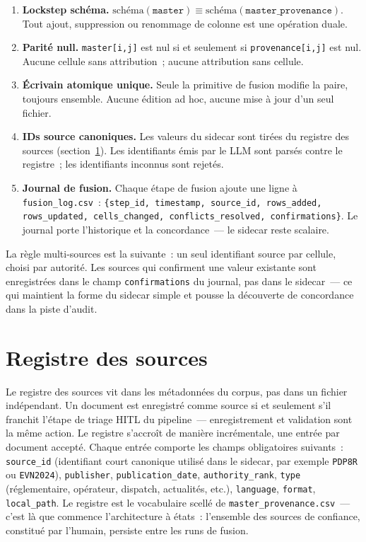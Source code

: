 \documentclass[a4paper,11pt]{report}
\begin{document}
\begin{enumerate}
\item \textbf{Lockstep schéma.} $\mathrm{schéma}(\texttt{master}) \equiv \mathrm{schéma}(\texttt{master\_provenance})$. Tout ajout, suppression ou renommage de colonne est une opération duale.
\item \textbf{Parité null.} \texttt{master[i,j]} est nul si et seulement si \texttt{provenance[i,j]} est nul. Aucune cellule sans attribution~; aucune attribution sans cellule.
\item \textbf{Écrivain atomique unique.} Seule la primitive de fusion modifie la paire, toujours ensemble. Aucune édition ad hoc, aucune mise à jour d'un seul fichier.
\item \textbf{IDs source canoniques.} Les valeurs du sidecar sont tirées du registre des sources (section~\ref{sec:registre}). Les identifiants émis par le LLM sont parsés contre le registre~; les identifiants inconnus sont rejetés.
\item \textbf{Journal de fusion.} Chaque étape de fusion ajoute une ligne à \texttt{fusion\_log.csv}~: \texttt{\{step\_id, timestamp, source\_id, rows\_added, rows\_updated, cells\_changed, conflicts\_resolved, confirmations\}}. Le journal porte l'historique et la concordance~--- le sidecar reste scalaire.
\end{enumerate}

La règle multi-sources est la suivante~: un seul identifiant source par cellule, choisi par autorité. Les sources qui confirment une valeur existante sont enregistrées dans le champ \texttt{confirmations} du journal, pas dans le sidecar~--- ce qui maintient la forme du sidecar simple et pousse la découverte de concordance dans la piste d'audit.

\section{Registre des sources}\label{sec:registre}

Le registre des sources vit dans les métadonnées du corpus, pas dans un fichier indépendant. Un document est enregistré comme source si et seulement s'il franchit l'étape de triage HITL du pipeline~--- enregistrement et validation sont la même action. Le registre s'accroît de manière incrémentale, une entrée par document accepté. Chaque entrée comporte les champs obligatoires suivants~: \texttt{source\_id} (identifiant court canonique utilisé dans le sidecar, par exemple \texttt{PDP8R} ou \texttt{EVN2024}), \texttt{publisher}, \texttt{publication\_date}, \texttt{authority\_rank}, \texttt{type} (réglementaire, opérateur, dispatch, actualités, etc.), \texttt{language}, \texttt{format}, \texttt{local\_path}. Le registre est le vocabulaire scellé de \texttt{master\_provenance.csv}~--- c'est là que commence l'architecture à états~: l'ensemble des sources de confiance, constitué par l'humain, persiste entre les runs de fusion.
\end{document}
